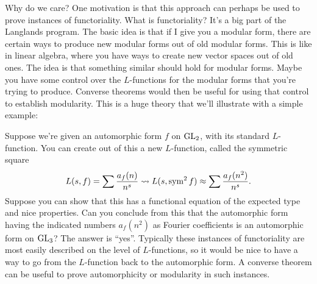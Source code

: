 \documentclass[reqno]{amsart} 
\numberwithin{theorem}{section}
\numberwithin{equation}{section}
\begin{document}
Why do we care?  One motivation is that this approach can perhaps be used to prove instances of functoriality.  What is functoriality?  It's a big part of the Langlands program.  The basic idea is that if I give you a modular form, there are certain ways to produce new modular forms out of old modular forms.  This is like in linear algebra, where you have ways to create new vector spaces out of old ones.  The idea is that something similar should hold for modular forms.  Maybe you have some control over the $L$-functions for the modular forms that you're trying to produce.  Converse theorems would then be useful for using that control to establish modularity.  This is a huge theory that we'll illustrate with a simple example:
\begin{example}
  Suppose we're given an automorphic form $f$ on $\operatorname{GL}_2$, with its standard $L$-function.  You can create out of this a new $L$-function, called the symmetric square
  \begin{equation*}
    L(s, f) = \sum \frac{a_f(n)}{ n^s} \rightsquigarrow
    L(s, \operatorname{sym}^2 f) \approx \sum \frac{a_f(n^2)}{ n^s}.
  \end{equation*}
  Suppose you can show that this has a functional equation of the expected type and nice properties.  Can you conclude from this that the automorphic form having the indicated numbers $a_f(n^2)$ as Fourier coefficients is an automorphic form on $\operatorname{GL}_3$?  The answer is ``yes''.  Typically these instances of functoriality are most easily described on the level of $L$-functions, so it would be nice to have a way to go from the $L$-function back to the automorphic form.  A converse theorem can be useful to prove automorphicity or modularity in such instances.
\end{example}
\end{document}
